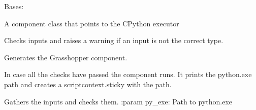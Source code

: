 \documentclass[letterpaper,10pt,english]{sphinxmanual}
\begin{document}

\begin{fulllineitems}
\label{\detokenize{miscellaneous:livestock.components.misc.PythonExecutor}}
Bases: {\hyperref[\detokenize{superclass:livestock.components.component.GHComponent}]{}}

A component class that points to the CPython executor

\begin{fulllineitems}
\label{\detokenize{miscellaneous:livestock.components.misc.PythonExecutor.check_inputs}}
Checks inputs and raises a warning if an input is not the correct type.

\end{fulllineitems}


\begin{fulllineitems}
\label{\detokenize{miscellaneous:livestock.components.misc.PythonExecutor.config}}
Generates the Grasshopper component.

\end{fulllineitems}


\begin{fulllineitems}
\label{\detokenize{miscellaneous:livestock.components.misc.PythonExecutor.run}}
In case all the checks have passed the component runs.
It prints the python.exe path and creates a scriptcontext.sticky with the path.

\end{fulllineitems}


\begin{fulllineitems}
\label{\detokenize{miscellaneous:livestock.components.misc.PythonExecutor.run_checks}}
Gathers the inputs and checks them.
:param py\_exe: Path to python.exe

\end{fulllineitems}


\end{fulllineitems}
\end{document}
